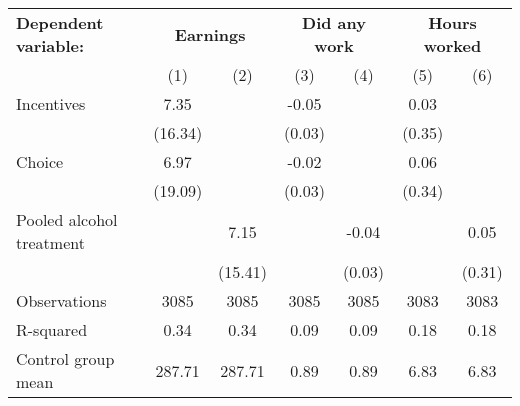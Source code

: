 \begin{tabular}{l c c c c c c} \toprule \textbf{Dependent variable:} & \multicolumn{2}{c}{\textbf{Earnings}} & \multicolumn{2}{c}{\textbf{Did any work}} & \multicolumn{2}{c}{\textbf{Hours worked}} \\ \cmidrule(lr){2-3} \cmidrule(lr){4-5} \cmidrule(lr){6-7}&\multicolumn{1}{c}{(1)}&\multicolumn{1}{c}{(2)}&\multicolumn{1}{c}{(3)}&\multicolumn{1}{c}{(4)}&\multicolumn{1}{c}{(5)}&\multicolumn{1}{c}{(6)}\\
\midrule
Incentives          &        7.35&            &       -0.05&            &        0.03&            \\
                    &     (16.34)&            &      (0.03)&            &      (0.35)&            \\
\addlinespace
Choice              &        6.97&            &       -0.02&            &        0.06&            \\
                    &     (19.09)&            &      (0.03)&            &      (0.34)&            \\
\addlinespace
Pooled alcohol treatment&            &        7.15&            &       -0.04&            &        0.05\\
                    &            &     (15.41)&            &      (0.03)&            &      (0.31)\\
\midrule
Observations        &        3085&        3085&        3085&        3085&        3083&        3083\\
R-squared           &        0.34&        0.34&        0.09&        0.09&        0.18&        0.18\\
Control group mean  &      287.71&      287.71&        0.89&        0.89&        6.83&        6.83\\
\bottomrule \end{tabular} 